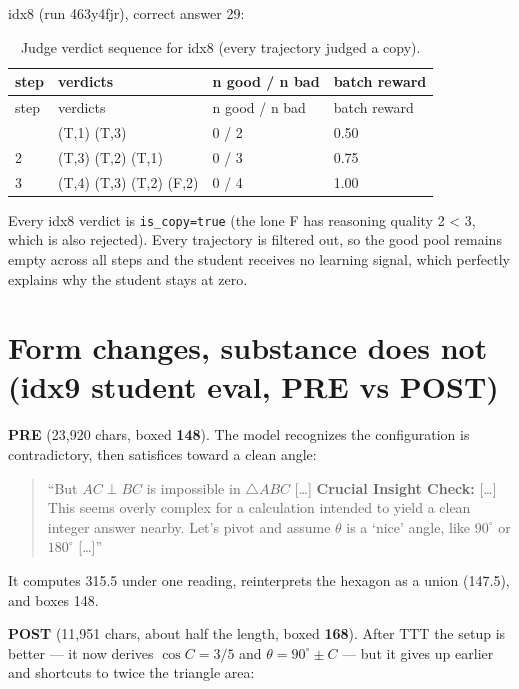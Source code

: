idx8 (run 463y4fjr), correct answer 29:

\begin{longtable}{llll}
\caption{Judge verdict sequence for idx8 (every trajectory judged a copy).}\\
\toprule
step & verdicts & n good / n bad & batch reward \\
\midrule
\endfirsthead
\toprule
step & verdicts & n good / n bad & batch reward \\
\midrule
\endhead
\bottomrule
\endfoot
1 & (T,1) (T,3) & 0 / 2 & 0.50 \\
2 & (T,3) (T,2) (T,1) & 0 / 3 & 0.75 \\
3 & (T,4) (T,3) (T,2) (F,2) & 0 / 4 & 1.00 \\
\end{longtable}

Every idx8 verdict is \texttt{is\_copy=true} (the lone F has reasoning quality 2 \textless{} 3, which is also rejected). Every trajectory is filtered out, so the good pool remains empty across all steps and the student receives no learning signal, which perfectly explains why the student stays at zero.

\section{Form changes, substance does not (idx9 student eval, PRE vs POST)}\label{d.3-form-changes-substance-does-not-idx9-student-eval-pre-vs-post}

\textbf{PRE} (23,920 chars, boxed \textbf{148}). The model recognizes the configuration is contradictory, then satisfices toward a clean angle:

\begin{quote}
``But \(AC \perp BC\) is impossible in \(\triangle ABC\) {[\ldots]} \textbf{Crucial Insight Check:} {[\ldots]} This seems overly complex for a calculation intended to yield a clean integer answer nearby. Let's pivot and assume \(\theta\) is a `nice' angle, like \(90^\circ\) or \(180^\circ\) {[\ldots]}''
\end{quote}

It computes 315.5 under one reading, reinterprets the hexagon as a union (147.5), and boxes 148.

\textbf{POST} (11,951 chars, about half the length, boxed \textbf{168}). After TTT the setup is better --- it now derives \(\cos C = 3/5\) and \(\theta = 90^\circ \pm C\) --- but it gives up earlier and shortcuts to twice the triangle area:


